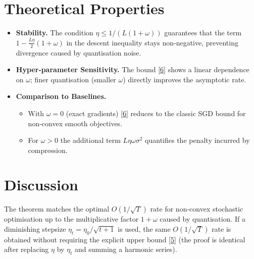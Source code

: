 \documentclass{article}
\begin{document}
\section*{Theoretical Properties}
\begin{itemize}
\item \textbf{Stability.} The condition $\eta\le 1/(L(1+\omega))$ guarantees that the term
$1-\frac{L\eta}{2}(1+\omega)$ in the descent inequality stays non‑negative, preventing divergence caused by quantisation noise.
\item \textbf{Hyper‑parameter Sensitivity.} The bound \eqref{6} shows a linear dependence on $\omega$; finer quantisation (smaller $\omega$) directly improves the asymptotic rate.
\item \textbf{Comparison to Baselines.}
    \begin{itemize}
    \item With $\omega=0$ (exact gradients) \eqref{6} reduces to the classic SGD bound for non‑convex smooth objectives.
    \item For $\omega>0$ the additional term $L\eta\omega\sigma^{2}$ quantifies the penalty incurred by compression.
    \end{itemize}
\end{itemize}

\section*{Discussion}
The theorem matches the optimal $O(1/\sqrt{T})$ rate for non‑convex stochastic optimisation up to the multiplicative factor $1+\omega$ caused by quantisation.  
If a diminishing stepsize $\eta_t=\eta_0/\sqrt{t+1}$ is used, the same $O(1/\sqrt{T})$ rate is obtained without requiring the explicit upper bound \eqref{5} (the proof is identical after replacing $\eta$ by $\eta_t$ and summing a harmonic series).

\newpage
\end{document}
